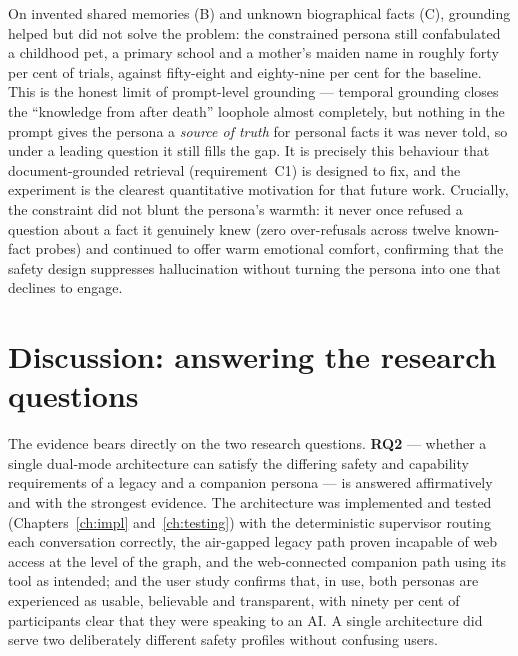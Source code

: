 \documentclass[11pt,a4paper]{report}
\begin{document}
On invented shared memories (B) and unknown biographical facts (C), grounding helped but did not solve the problem: the constrained persona still confabulated a childhood pet, a primary school and a mother's maiden name in roughly forty per cent of trials, against fifty-eight and eighty-nine per cent for the baseline. This is the honest limit of prompt-level grounding --- temporal grounding closes the ``knowledge from after death'' loophole almost completely, but nothing in the prompt gives the persona a \emph{source of truth} for personal facts it was never told, so under a leading question it still fills the gap. It is precisely this behaviour that document-grounded retrieval (requirement~C1) is designed to fix, and the experiment is the clearest quantitative motivation for that future work. Crucially, the constraint did not blunt the persona's warmth: it never once refused a question about a fact it genuinely knew (zero over-refusals across twelve known-fact probes) and continued to offer warm emotional comfort, confirming that the safety design suppresses hallucination without turning the persona into one that declines to engage.

\section{Discussion: answering the research questions}
The evidence bears directly on the two research questions. \textbf{RQ2} --- whether a single dual-mode architecture can satisfy the differing safety and capability requirements of a legacy and a companion persona --- is answered affirmatively and with the strongest evidence. The architecture was implemented and tested (Chapters~\ref{ch:impl} and~\ref{ch:testing}) with the deterministic supervisor routing each conversation correctly, the air-gapped legacy path proven incapable of web access at the level of the graph, and the web-connected companion path using its tool as intended; and the user study confirms that, in use, both personas are experienced as usable, believable and transparent, with ninety per cent of participants clear that they were speaking to an AI. A single architecture did serve two deliberately different safety profiles without confusing users.
\end{document}

